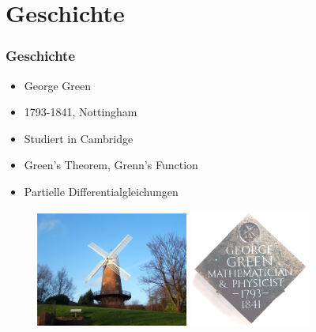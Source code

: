 \section{Geschichte}

\begin{frame}
\frametitle{Geschichte} 
	\begin{itemize}[<+->]
		\item George Green
		\item 1793-1841, Nottingham
		\item Studiert in Cambridge
		\item Green's Theorem, Grenn's Function
		\item Partielle Differentialgleichungen
	\end{itemize}
	
	\begin{figure}
	\centering
		\pause[6] \includegraphics[width=5cm]{./images/Greens_windmill}
		\pause[7] \includegraphics[width=4cm]{./images/george_green_plaque2}
	\end{figure}

\end{frame}


